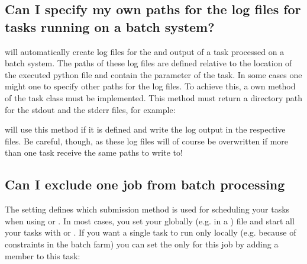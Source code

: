 \documentclass[letterpaper,10pt,english]{sphinxmanual}
\begin{document}
\subsection{Can I specify my own paths for the log files for tasks running on a batch system?}
\label{\detokenize{advanced/faq:can-i-specify-my-own-paths-for-the-log-files-for-tasks-running-on-a-batch-system}}
 will automatically create log files for the  and 
output of a task processed on a batch system. The paths of these log files are defined
relative to the location of the executed python file and contain the parameter of
the task.
In some cases one might one to specify other paths for the log files. To achieve this,
a own  method of the task class must be implemented. This method
must return a directory path for the stdout and the stderr files, for example:

\begin{sphinxVerbatim}[commandchars=\\\{\}]
 
     
          \PYG{p}{[}\PYG{p}{]}
           
         
\end{sphinxVerbatim}

 will use this method if it is defined and write the log output in the respective
files. Be careful, though, as these log files will of course be overwritten if more than one
task receive the same paths to write to!


\subsection{Can I exclude one job from batch processing}
\label{\detokenize{advanced/faq:can-i-exclude-one-job-from-batch-processing}}
The setting  defines which submission method is used for scheduling
your tasks when using  or .
In most cases, you set your  globally (e.g. in a )
file and start all your tasks with  or .
If you want a single task to run only locally (e.g. because of constraints in
the batch farm) you can set the  only for this job by adding a member to this task:
\end{document}

